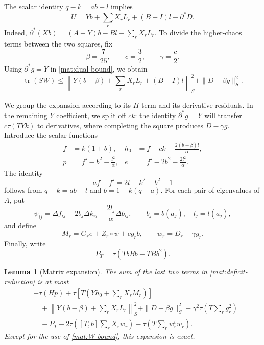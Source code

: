 \documentclass[11pt]{article}
\newtheorem{lemma}[theorem]{Lemma}
\theoremstyle{definition}
\theoremstyle{remark}
\numberwithin{equation}{section}
\begin{document}
The scalar identity $q-k=ab-l$ implies
\begin{equation}\label{mat:U-representation}
 U=Yb+\sum_rX_rL_r+(B-I)l-\partial^*D.
\end{equation}
Indeed,
$\partial^*(Xb)=(A-Y)b-Bl-\sum_rX_rL_r$.
To divide the higher-chaos terms between the two squares, fix
\begin{equation}\label{mat:constants}
 \beta=\frac7{25},\qquad c=\frac32,\qquad \gamma=\frac c2.
\end{equation}
Using $\partial^*g=Y$ in \eqref{mat:dual-bound}, we obtain
\begin{equation}\label{mat:W-bound}
 \operatorname{tr}(SW)\le
 \left\|Y(b-\beta)+\sum_rX_rL_r+(B-I)l\right\|_S^2
 +\|D-\beta g\|_S^2.
\end{equation}

We group the expansion according to its $H$ term and its derivative
residuals.  In the remaining $Y$ coefficient, we
split off $ck$: the identity $\partial^*g=Y$ will transfer
$c\tau(TYk)$ to derivatives, where completing the square produces
$D-\gamma g$.  Introduce the scalar functions
\begin{equation}\label{mat:scalar-functions}
 \begin{aligned}
 f&=k(1+b),&
 h_0&=f-ck-\frac{2(b-\beta)l}{\alpha},\\
 p&=f'-b^2-\frac{l^2}{\alpha},&
 e&=f'-2b^2-\frac{2l^2}{\alpha}.
 \end{aligned}
\end{equation}
The identity
\[
 af-f'=2t-k^2-b^2-1
\]
follows from $q-k=ab-l$ and $b=1-k(q-a)$.
For each pair of eigenvalues of $A$, put
\[
 \psi_{ij}=\Delta f_{ij}-2b_j\Delta k_{ij}
                         -\frac{2l_j}{\alpha}\Delta b_{ij},
 \qquad b_j=b(a_j),\quad l_j=l(a_j),
\]
and define
\begin{equation}\label{mat:M-w}
 M_r=G_re+Z_r\circ\psi+cg_rb,\qquad w_r=D_r-\gamma g_r.
\end{equation}
Finally, write
\begin{equation}\label{mat:P-definition}
 P_T=\tau(TbBb-TBb^2).
\end{equation}

\begin{lemma}[Matrix expansion]\label{mat:expansion}
The sum of the last two terms in \eqref{mat:deficit-reduction} is at
most
\begin{align}
 &-\tau(Hp)+\tau\left[T\left(Yh_0+\sum_rX_rM_r\right)\right]
       \label{mat:expanded-bound}\\
 &\quad+\left\|Y(b-\beta)+\sum_rX_rL_r\right\|_S^2
       +\|D-\beta g\|_S^2+\gamma^2\tau\left(T\sum_rg_r^2\right)\nonumber\\
 &\quad-P_T-2\tau\left([T,b]\sum_rX_rw_r\right)
                 -\tau\left(T\sum_rw_r^tw_r\right).\nonumber
\end{align}
Except for the use of \eqref{mat:W-bound}, this expansion is exact.
\end{lemma}
\end{document}

